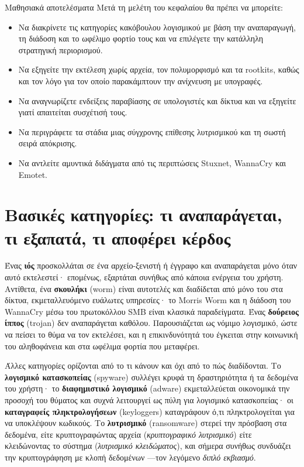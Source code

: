 \documentclass[11pt,openany]{book}
\begin{document}
\begin{outcomesbox}{Μαθησιακά αποτελέσματα}
Μετά τη μελέτη του κεφαλαίου θα πρέπει να μπορείτε:
\begin{itemize}
  \item Να διακρίνετε τις κατηγορίες κακόβουλου λογισμικού με βάση την αναπαραγωγή, τη διάδοση και το ωφέλιμο φορτίο τους και να επιλέγετε την κατάλληλη στρατηγική περιορισμού.
  \item Να εξηγείτε την εκτέλεση χωρίς αρχεία, τον πολυμορφισμό και τα rootkits, καθώς και τον λόγο για τον οποίο παρακάμπτουν την ανίχνευση με υπογραφές.
  \item Να αναγνωρίζετε ενδείξεις παραβίασης σε υπολογιστές και δίκτυα και να εξηγείτε γιατί απαιτείται συσχέτισή τους.
  \item Να περιγράφετε τα στάδια μιας σύγχρονης επίθεσης λυτρισμικού και τη σωστή σειρά απόκρισης.
  \item Να αντλείτε αμυντικά διδάγματα από τις περιπτώσεις Stuxnet, WannaCry και Emotet.
\end{itemize}
\end{outcomesbox}

\section{Βασικές κατηγορίες: τι αναπαράγεται, τι εξαπατά, τι αποφέρει κέρδος}\label{sec:4.1}
Ένας \textbf{ιός} προσκολλάται σε ένα αρχείο-ξενιστή ή έγγραφο και αναπαράγεται μόνο όταν αυτό εκτελεστεί· επομένως, εξαρτάται συνήθως από κάποια ενέργεια του χρήστη. Αντίθετα, ένα \textbf{σκουλήκι} (worm) είναι αυτοτελές και διαδίδεται από μόνο του στα δίκτυα, εκμεταλλευόμενο ευάλωτες υπηρεσίες· το Morris Worm και η διάδοση του WannaCry μέσω του πρωτοκόλλου SMB είναι κλασικά παραδείγματα. Ένας \textbf{δούρειος ίππος} (trojan) δεν αναπαράγεται καθόλου. Παρουσιάζεται ως νόμιμο λογισμικό, ώστε να πείσει το θύμα να τον εκτελέσει, και η επικινδυνότητά του έγκειται στην κοινωνική του αληθοφάνεια και στα ωφέλιμα φορτία που μεταφέρει.

Άλλες κατηγορίες ορίζονται από το τι κάνουν και όχι από το πώς διαδίδονται. Το \textbf{λογισμικό κατασκοπείας} (spyware) συλλέγει κρυφά τη δραστηριότητα ή τα δεδομένα του χρήστη· το \textbf{διαφημιστικό λογισμικό} (adware) εκμεταλλεύεται οικονομικά την προσοχή του θύματος και συχνά λειτουργεί ως πύλη για λογισμικό κατασκοπείας· οι \textbf{καταγραφείς πληκτρολογήσεων} (keyloggers) καταγράφουν ό,τι πληκτρολογείται για να υποκλέψουν κωδικούς. Το \textbf{λυτρισμικό} (ransomware) στερεί την πρόσβαση στα δεδομένα, είτε κρυπτογραφώντας αρχεία (\emph{κρυπτογραφικό λυτρισμικό}) είτε κλειδώνοντας το σύστημα (\emph{λυτρισμικό κλειδώματος}), και σήμερα συνήθως συνδυάζει την κρυπτογράφηση με κλοπή δεδομένων —τον λεγόμενο \emph{διπλό εκβιασμό}.
\end{document}
